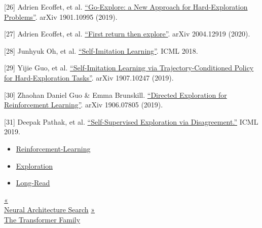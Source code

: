 {[}26{]} Adrien Ecoffet, et al. \href{https://arxiv.org/abs/1901.10995}{``Go-Explore: a New Approach for Hard-Exploration Problems''}. arXiv 1901.10995 (2019).

{[}27{]} Adrien Ecoffet, et al. \href{https://arxiv.org/abs/2004.12919}{``First return then explore''}. arXiv 2004.12919 (2020).

{[}28{]} Junhyuk Oh, et al. \href{https://arxiv.org/abs/1806.05635}{``Self-Imitation Learning''}. ICML 2018.

{[}29{]} Yijie Guo, et al. \href{https://arxiv.org/abs/1907.10247}{``Self-Imitation Learning via Trajectory-Conditioned Policy for Hard-Exploration Tasks''}. arXiv 1907.10247 (2019).

{[}30{]} Zhaohan Daniel Guo \& Emma Brunskill. \href{https://arxiv.org/abs/1906.07805}{``Directed Exploration for Reinforcement Learning''}. arXiv 1906.07805 (2019).

{[}31{]} Deepak Pathak, et al. \href{https://arxiv.org/abs/1906.04161}{``Self-Supervised Exploration via Disagreement.''} ICML 2019.

\begin{itemize}
\tightlist
\item
  \href{https://lilianweng.github.io/tags/reinforcement-learning/}{Reinforcement-Learning}
\item
  \href{https://lilianweng.github.io/tags/exploration/}{Exploration}
\item
  \href{https://lilianweng.github.io/tags/long-read/}{Long-Read}
\end{itemize}

\href{https://lilianweng.github.io/posts/2020-08-06-nas/}{{« }\\
{Neural Architecture Search}} \href{https://lilianweng.github.io/posts/2020-04-07-the-transformer-family/}{{ »}\\
{The Transformer Family}}

